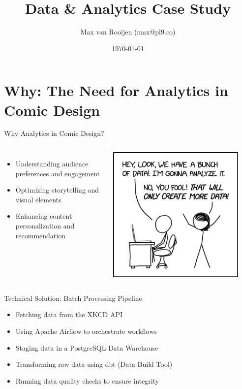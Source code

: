 \documentclass{beamer}
\title{Data \& Analytics Case Study}
\author{Max van Rooijen (max@pl9.co)}
\date{\today}
\begin{document}
\frame{\titlepage}

\section{Why: The Need for Analytics in Comic Design}
\begin{frame}{Why Analytics in Comic Design?}
    \begin{columns}
        \begin{itemize}
            \item Understanding audience preferences and engagement
            \item Optimizing storytelling and visual elements
            \item Enhancing content personalization and recommendation
        \end{itemize}
        \centering
        \includegraphics[width=0.9\textwidth]{../screenshots/data_trap_2x.png}
    \end{columns}
\end{frame}

\begin{frame}{Technical Solution: Batch Processing Pipeline}
    \begin{itemize}
        \item Fetching data from the XKCD API
        \item Using Apache Airflow to orchestrate workflows
        \item Staging data in a PostgreSQL Data Warehouse
        \item Transforming raw data using dbt (Data Build Tool)
        \item Running data quality checks to ensure integrity
    \end{itemize}
\end{frame}
\end{document}
